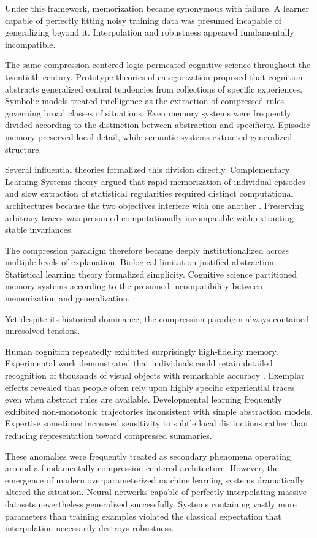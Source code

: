 \documentclass[12pt,a4paper]{article}
\begin{document}
Under this framework, memorization became synonymous with failure. A learner capable of perfectly fitting noisy training data was presumed incapable of generalizing beyond it. Interpolation and robustness appeared fundamentally incompatible.

The same compression-centered logic permeated cognitive science throughout the twentieth century. Prototype theories of categorization proposed that cognition abstracts generalized central tendencies from collections of specific experiences. Symbolic models treated intelligence as the extraction of compressed rules governing broad classes of situations. Even memory systems were frequently divided according to the distinction between abstraction and specificity. Episodic memory preserved local detail, while semantic systems extracted generalized structure.

Several influential theories formalized this division directly. Complementary Learning Systems theory argued that rapid memorization of individual episodes and slow extraction of statistical regularities required distinct computational architectures because the two objectives interfere with one another \cite{McClelland1995,McClellandGoddard1996}. Preserving arbitrary traces was presumed computationally incompatible with extracting stable invariances.

The compression paradigm therefore became deeply institutionalized across multiple levels of explanation. Biological limitation justified abstraction. Statistical learning theory formalized simplicity. Cognitive science partitioned memory systems according to the presumed incompatibility between memorization and generalization.

Yet despite its historical dominance, the compression paradigm always contained unresolved tensions.

Human cognition repeatedly exhibited surprisingly high-fidelity memory. Experimental work demonstrated that individuals could retain detailed recognition of thousands of visual objects with remarkable accuracy \cite{Brady2008}. Exemplar effects revealed that people often rely upon highly specific experiential traces even when abstract rules are available. Developmental learning frequently exhibited non-monotonic trajectories inconsistent with simple abstraction models. Expertise sometimes increased sensitivity to subtle local distinctions rather than reducing representation toward compressed summaries.

These anomalies were frequently treated as secondary phenomena operating around a fundamentally compression-centered architecture. However, the emergence of modern overparameterized machine learning systems dramatically altered the situation. Neural networks capable of perfectly interpolating massive datasets nevertheless generalized successfully. Systems containing vastly more parameters than training examples violated the classical expectation that interpolation necessarily destroys robustness.
\end{document}
